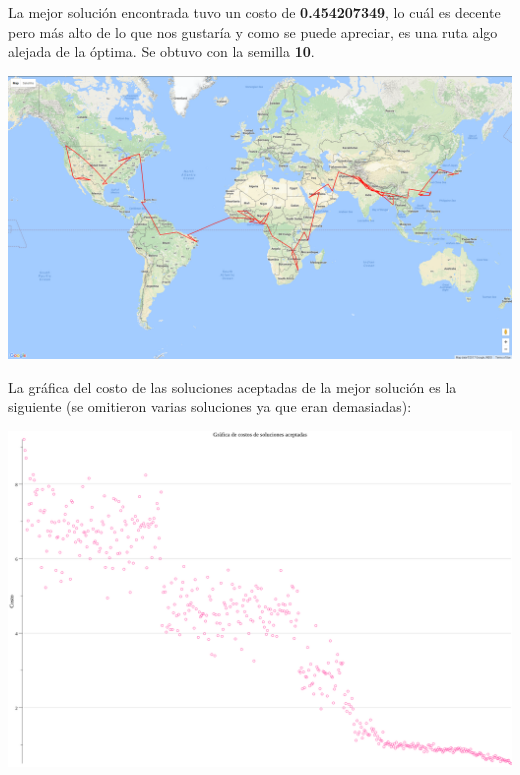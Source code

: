 \documentclass[12pt]{article}
\begin{document}
La mejor solución encontrada tuvo un costo de \textbf{0.454207349}, lo cuál es decente pero más alto de lo que nos gustaría y como se puede apreciar, es una ruta algo alejada de la óptima. Se obtuvo con la semilla \textbf{10}. \\

\begin{center}
  \includegraphics[scale=0.2]{../archivos/mapas/mapa1.png} \\
\end{center}

La gráfica del costo de las soluciones aceptadas de la mejor solución es la siguiente (se omitieron varias soluciones ya que eran demasiadas): \\

\begin{center}
\includegraphics[scale=0.3]{../archivos/graficas/soluciones-aceptadas/costos1.png} \\
\end{center}
\end{document}

